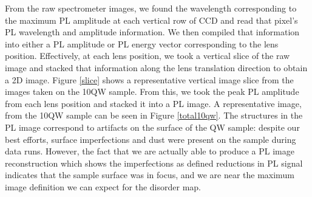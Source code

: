 \indent From the raw spectrometer images, we found the wavelength corresponding to the maximum PL amplitude at each vertical row of CCD and read that pixel's PL wavelength and amplitude information. We then compiled that information into either a PL amplitude or PL energy vector corresponding to the lens position. Effectively, at each lens position, we took a vertical slice of the raw image and stacked that information along the lens translation direction to obtain a 2D image. Figure \ref{slice} shows a representative vertical image slice from the images taken on the 10QW sample. From this, we took the peak PL amplitude from each lens position and stacked it into a PL image. A representative image, from the 10QW sample can be seen in Figure \ref{total10qw}. The structures in the PL image correspond to artifacts on the surface of the QW sample: despite our best efforts, surface imperfections and dust were present on the sample during data runs. However, the fact that we are actually able to produce a PL image reconstruction which shows the imperfections as defined reductions in PL signal indicates that the sample surface was in focus, and we are near the maximum image definition we can expect for the disorder map. 

